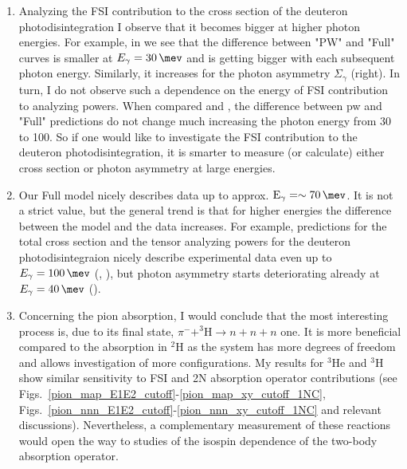\begin{enumerate}
    \item Analyzing the FSI contribution to the cross section of the deuteron photodisintegration 
    I observe that it becomes bigger at higher photon energies.
    For example, in  we see that the difference between "PW" and "Full" curves
    is smaller at $E_\gamma = \SI{30}{\mev}$ and is getting bigger with each subsequent photon energy. 
    Similarly, it increases for the photon asymmetry $\Sigma_\gamma$ (right).
    In turn, I do not observe such a dependence on the energy of FSI contribution to analyzing powers.
    When compared  and , the difference between \gls{pw} and "Full"
    predictions do not change much increasing the photon energy from \SI{30}{\mev} to \SI{100}{\mev}.
    So if one would like to investigate the FSI contribution to the deuteron photodisintegration,
    it is smarter to measure (or calculate) either cross section or photon asymmetry at large energies.
    \item Our Full model nicely describes data up to approx. $\text{E}_\gamma = \sim\SI{70}{\mev}$. It is not a strict value, but the general trend is that for higher energies the difference between the model and the data increases.
    For example, predictions for the total cross section and the tensor analyzing powers for the deuteron photodisintegraion nicely describe experimental data even up to $E_\gamma = \SI{100}{\mev}$ (, ), but photon asymmetry starts deteriorating already at $E_\gamma = \SI{40}{\mev}$ ().
    \item Concerning the pion absorption, I would conclude that the most interesting process is, due to its final state, 
    $\pi^- + ^3\text{H} \rightarrow n + n + n$ one.
    It is more beneficial compared to the absorption in $^2$H as the system has more degrees of freedom and allows
    investigation of more configurations.
    My results for $^3$He and $^3$H show similar sensitivity to FSI and 2N absorption operator contributions
    (see Figs.~\ref{pion_map_E1E2_cutoff}-\ref{pion_map_xy_cutoff_1NC}, Figs.~\ref{pion_nnn_E1E2_cutoff}-\ref{pion_nnn_xy_cutoff_1NC}
    and relevant discussions).
    Nevertheless, a complementary measurement of these reactions would open the way to studies of the isospin dependence of the two-body absorption operator.
\end{enumerate}

